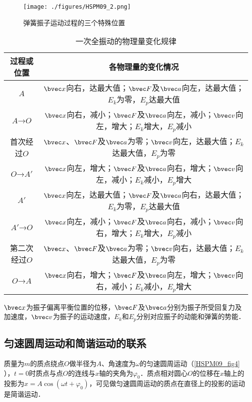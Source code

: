 \begin{figure}[ht]
\centering
\texttt{[image: ./figures/HSPM09\_2.png]}
\caption{弹簧振子运动过程的三个特殊位置} \label{HSPM09_fig2}
\end{figure}

\begin{table}[ht]
\centering
\caption{一次全振动的物理量变化规律}\label{HSPM09_tab1}
\begin{tabular}{|c|c|}
\hline
过程或位置 & 各物理量的变化情况 \\
\hline
$A$ & $\bvec x$向右，达最大值；$\bvec F$及$\bvec a$向左，达最大值；$E_k$为零，$E_p$达最大值 \\
\hline
$A$→$O$ & $\bvec x$向右，减小；$\bvec F$及$\bvec a$向左，减小；$\bvec v$向左，增大；$E_k$增大，$E_p$减小 \\
\hline
首次经过$O$ & $\bvec x$、$\bvec F$及$\bvec a$为零；$\bvec v$向左，达最大值；$E_k$达最大值，$E_p$为零 \\
\hline
$O$→$A'$ & $\bvec x$向左，增大；$\bvec F$及$\bvec a$向右，增大；$\bvec v$向左，减小；$E_k$减小，$E_p$增大 \\
\hline
$A'$ & $\bvec x$向左，达最大值；$\bvec F$及$\bvec a$向右，达最大值；$E_k$为零，$E_p$达最大值 \\
\hline
$A'$→$O$ & $\bvec x$向左，减小；$\bvec F$及$\bvec a$向右，减小；$\bvec v$向右，增大；$E_k$增大，$E_p$减小 \\
\hline
第二次经过$O$ & $\bvec x$、$\bvec F$及$\bvec a$为零；$\bvec v$向右，达最大值；$E_k$达最大值，$E_p$为零 \\
\hline
$O$→$A$ & $\bvec x$向右，增大；$\bvec F$及$\bvec a$向左，增大；$\bvec v$向右，减小；$E_k$减小，$E_p$增大 \\
\hline
\end{tabular}
\end{table}
$\bvec x$为振子偏离平衡位置的位移，$\bvec F$及$\bvec a$分别为振子所受回复力及加速度，$\bvec v$为振子的运动速度，$E_k$和$E_p$分别对应振子的动能和弹簧的势能．

\subsection{匀速圆周运动和简谐运动的联系}

质量为$m$的质点绕点$O$做半径为$A$、角速度为$\omega$的匀速圆周运动（\autoref{HSPM09_fig4} ），$t=0$时质点与点$O$的连线与$x$轴的夹角为$\varphi_0$．质点相对圆心$O$的位移在$x$轴上的投影为$x=A\cos(\omega t + \varphi_0)$，可见做匀速圆周运动的质点在直径上的投影的运动是简谐运动．

